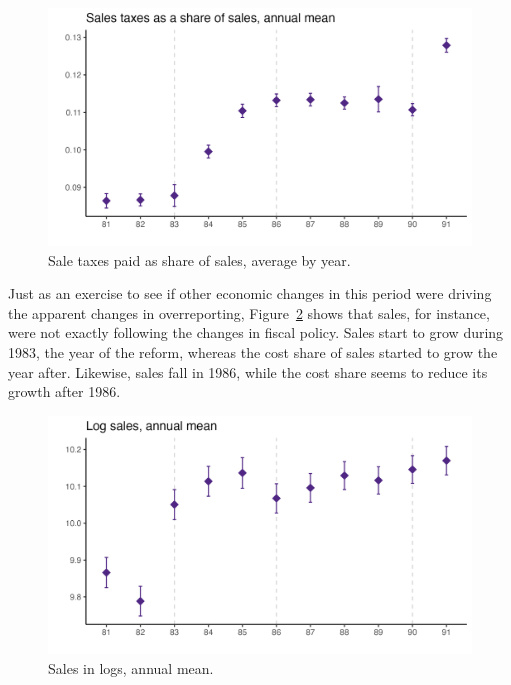 \documentclass[
  12pt]{article}
\theoremstyle{definition}
\theoremstyle{remark}
\begin{document}
\begin{figure}

{\centering \includegraphics[width=1\textwidth,height=\textheight]{../Results/Figures/Colombia/share_sales_tax_byy.png}

}

\caption{\label{fig-vat}Sale taxes paid as share of sales, average by
year.}

\end{figure}

Just as an exercise to see if other economic changes in this period were
driving the apparent changes in overreporting, Figure~\ref{fig-logsales}
shows that sales, for instance, were not exactly following the changes
in fiscal policy. Sales start to grow during 1983, the year of the
reform, whereas the cost share of sales started to grow the year after.
Likewise, sales fall in 1986, while the cost share seems to reduce its
growth after 1986.

\begin{figure}

{\centering \includegraphics[width=1\textwidth,height=\textheight]{../Results/Figures/Colombia/log_sales_byy.png}

}

\caption{\label{fig-logsales}Sales in logs, annual mean.}

\end{figure}
\end{document}
